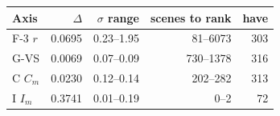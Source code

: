\begin{tabular}{lrrrr}
\toprule
Axis & $\Delta$ & $\sigma$ range & scenes to rank & have \\
\midrule
F-3 $r$ & 0.0695 & 0.23--1.95 & 81--6073 & 303 \\
G-VS & 0.0069 & 0.07--0.09 & 730--1378 & 316 \\
C $C_m$ & 0.0230 & 0.12--0.14 & 202--282 & 313 \\
I $I_m$ & 0.3741 & 0.01--0.19 & 0--2 & 72 \\
\bottomrule
\end{tabular}
